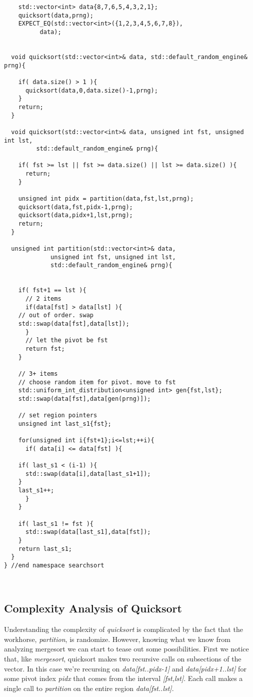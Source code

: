 \documentclass[]{tufte-handout}
\begin{document}
\begin{verbatim}
    std::vector<int> data{8,7,6,5,4,3,2,1};
    quicksort(data,prng);
    EXPECT_EQ(std::vector<int>({1,2,3,4,5,6,7,8}),
	      data);


  void quicksort(std::vector<int>& data, std::default_random_engine& prng){

    if( data.size() > 1 ){
      quicksort(data,0,data.size()-1,prng);
    }
    return;
  }

  void quicksort(std::vector<int>& data, unsigned int fst, unsigned int lst, 
		 std::default_random_engine& prng){
    
    if( fst >= lst || fst >= data.size() || lst >= data.size() ){
      return;
    }

    unsigned int pidx = partition(data,fst,lst,prng);
    quicksort(data,fst,pidx-1,prng);
    quicksort(data,pidx+1,lst,prng);
    return;
  }
  
  unsigned int partition(std::vector<int>& data, 
			 unsigned int fst, unsigned int lst, 
			 std::default_random_engine& prng){

    
    if( fst+1 == lst ){
      // 2 items
      if(data[fst] > data[lst] ){
	// out of order. swap
	std::swap(data[fst],data[lst]);
      }
      // let the pivot be fst
      return fst;
    }

    // 3+ items
    // choose random item for pivot. move to fst
    std::uniform_int_distribution<unsigned int> gen{fst,lst};
    std::swap(data[fst],data[gen(prng)]);

    // set region pointers
    unsigned int last_s1{fst};

    for(unsigned int i{fst+1};i<=lst;++i){
      if( data[i] <= data[fst] ){

	if( last_s1 < (i-1) ){
	  std::swap(data[i],data[last_s1+1]);
	}
	last_s1++;
      }
    }
    
    if( last_s1 != fst ){
      std::swap(data[last_s1],data[fst]);
    }
    return last_s1;
  }  
} //end namespace searchsort

	
\end{verbatim}

\subsection{Complexity Analysis of Quicksort}

Understanding the complexity of \textit{quicksort} is complicated by the fact that the workhorse, \textit{partition}, is randomize. However, knowing what we know from analyzing mergesort we can start to tease out some possibilities. First we notice that, like \textit{mergesort}, quicksort makes two recursive calls on subsections of the vector. In this case we're recursing on \textit{data[fst..pidx-1]} and \textit{data[pidx+1..lst]} for some pivot index \textit{pidx} that comes from the interval \textit{[fst,lst]}. Each call makes a single call to \textit{partition} on the entire region \textit{data[fst..lst]}. 
\end{document}
